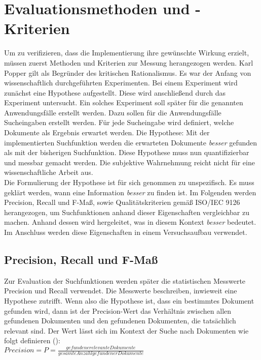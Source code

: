 \chapter{Evaluationsmethoden und -Kriterien}
\label{chap:evaluationsmethoden}
Um zu verifizieren, dass die Implementierung ihre gewünschte Wirkung erzielt, müssen zuerst Methoden und Kriterien zur Messung herangezogen werden.
Karl Popper gilt als Begründer des kritischen Rationalismus.
Es war der Anfang von wissenschaftlich durchgeführten Experimenten.
Bei einem Experiment wird zunächst eine Hypothese aufgestellt.
Diese wird anschließend durch das Experiment untersucht.
Ein solches Experiment soll später für die genannten Anwendungsfälle erstellt werden.
Dazu sollen für die Anwendungsfälle Sucheingaben erstellt werden.
Für jede Sucheingabe wird definiert, welche Dokumente als Ergebnis erwartet werden.
Die Hypothese: Mit der implementierten Suchfunktion werden die erwarteten Dokumente \textit{besser} gefunden als mit der bisherigen Suchfunktion.
Diese Hypothese muss nun quantifizierbar und messbar gemacht werden.
Die subjektive Wahrnehmung reicht nicht für eine wissenschaftliche Arbeit aus.\\

Die Formulierung der Hypothese ist für sich genommen zu unspezifisch.
Es muss geklärt werden, wann eine Information \textit{besser} zu finden ist.
Im Folgenden werden Precision, Recall und F-Maß, sowie Qualitätskriterien gemäß ISO/IEC 9126 herangezogen, um Suchfunktionen anhand dieser Eigenschaften vergleichbar zu machen.
Anhand dessen wird hergeleitet, was in diesem Kontext \textit{besser} bedeutet.
Im Anschluss werden diese Eigenschaften in einem Versuchsaufbau verwendet. 

\section{Precision, Recall und F-Maß}
Zur Evaluation der Suchfunktionen werden später die statistischen Messwerte Precision und Recall verwendet.
Die Messwerte beschreiben, inwieweit eine Hypothese zutrifft.
Wenn also die Hypothese ist, dass ein bestimmtes Dokument gefunden wird, dann ist der Precision-Wert das Verhältnis zwischen allen gefundenen Dokumenten und den gefundenen Dokumenten, die tatsächlich relevant sind.
Der Wert lässt sich im Kontext der Suche nach Dokumenten wie folgt definieren (\cite{Sirotkin_2012}):\\

\(Precision=P=\frac{gefundene relevante Dokumente}{gesamte Anzahl gefundener Dokumente} \)\\

